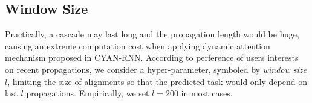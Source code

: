 \subsection{Window Size}
Practically, a cascade may last long and the propagation length would be huge,
causing an extreme computation cost when applying dynamic attention mechanism
proposed in CYAN-RNN. According to perference of users interests on recent
propagations, we consider a hyper-parameter, symboled by \emph{window size}
$l$, limiting the size of alignments so that the predicted task would only depend on
last $l$ propagations. Empirically, we set $l=200$ in most cases.

